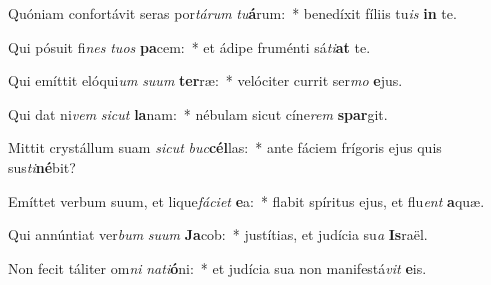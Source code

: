 \item Quóniam confortávit seras por\textit{tá}\textit{rum} \textit{tu}\textbf{á}rum:~* benedíxit fíliis tu\textit{is} \textbf{in} te.
\item Qui pósuit fi\textit{nes} \textit{tu}\textit{os} \textbf{pa}cem:~* et ádipe fruménti sá\textit{ti}\textbf{at} te.
\item Qui emíttit elóqui\textit{um} \textit{su}\textit{um} \textbf{ter}ræ:~* velóciter currit ser\textit{mo} \textbf{e}jus.
\item Qui dat ni\textit{vem} \textit{sic}\textit{ut} \textbf{la}nam:~* nébulam sicut cíne\textit{rem} \textbf{spar}git.
\item Mittit crystállum suam \textit{sic}\textit{ut} \textit{buc}\textbf{cél}las:~* ante fáciem frígoris ejus quis sus\textit{ti}\textbf{né}bit?
\item Emíttet verbum suum, et lique\textit{fá}\textit{ci}\textit{et} \textbf{e}a:~* flabit spíritus ejus, et flu\textit{ent} \textbf{a}quæ.
\item Qui annúntiat ver\textit{bum} \textit{su}\textit{um} \textbf{Ja}cob:~* justítias, et judícia su\textit{a} \textbf{Is}raël.
\item Non fecit táliter om\textit{ni} \textit{na}\textit{ti}\textbf{ó}ni:~* et judícia sua non manifestá\textit{vit} \textbf{e}is.
